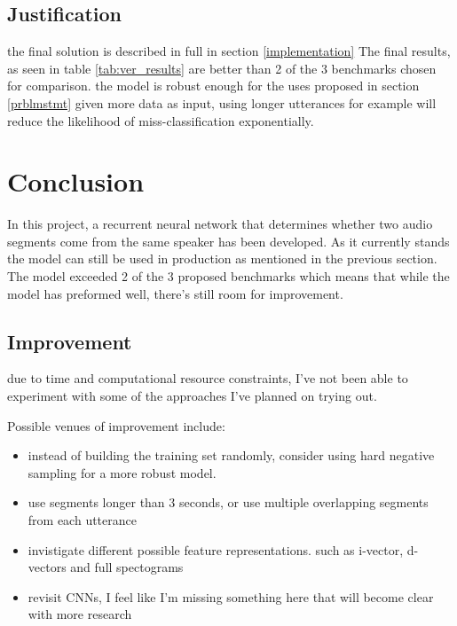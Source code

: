 \documentclass{article}
\begin{document}
\subsection{Justification}

the final solution is described in full in section \ref{implementation}
The final results, as seen in table \ref{tab:ver_results} are better than 2 of the 3 benchmarks chosen for comparison. the model is robust enough for the uses proposed in section \ref{prblmstmt} given more data as input, using longer utterances for example will reduce the likelihood of miss-classification exponentially.
\section{Conclusion}
In this project, a recurrent neural network that determines whether two audio segments come from the same speaker has been developed.  As it currently stands the model can still be used in production as mentioned in the previous section. The model exceeded 2 of the 3 proposed benchmarks which means that while the model has preformed well, there's still room for improvement.
\subsection{Improvement}
due to time and computational resource constraints, I've not been able to experiment with some of the approaches I've planned on trying out.

Possible venues of improvement include:
\begin{itemize}
    \item instead of building the training set randomly, consider using hard negative sampling for a more robust model.
    \item use segments longer than 3 seconds, or use multiple overlapping segments from each utterance
    \item invistigate different possible feature representations. such as i-vector, d-vectors and full spectograms
    \item revisit CNNs, I feel like I'm missing something here that will become clear with more research
\end{itemize}

\pagebreak


\end{document}
